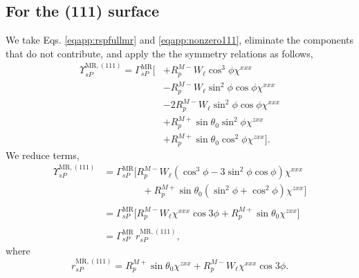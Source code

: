 \subsection{For the (111) surface}

We take Eqs. \eqref{eqapp:rspfullmr} and \eqref{eqapp:nonzero111}, eliminate the
components that do not contribute, and apply the the symmetry relations as
follows,
\begin{equation*}
\begin{split}
\Upsilon^{\mathrm{MR},(111)}_{sP} =
\Gamma^{\mathrm{MR}}_{sP}
\big[
&+ R^{M-}_{p}W_{\ell}\cos^{3}\phi\chi^{xxx}\\
&- R^{M-}_{p}W_{\ell}\sin^{2}\phi\cos\phi\chi^{xxx}\\
&- 2R^{M-}_{p}W_{\ell}\sin^{2}\phi\cos\phi\chi^{xxx}\\
&+ R^{M+}_{p}\sin\theta_{0}\sin^{2}\phi\chi^{zxx}\\
&+ R^{M+}_{p}\sin\theta_{0}\cos^{2}\phi\chi^{zxx}
\big].
\end{split}
\end{equation*}
We reduce terms,
\begin{equation*}
\begin{split}
\Upsilon^{\mathrm{MR},(111)}_{sP} &=
\Gamma^{\mathrm{MR}}_{sP}
\big[
R^{M-}_{p}W_{\ell}(\cos^{3}\phi - 3\sin^{2}\phi\cos\phi)\chi^{xxx}\\
&\qquad\qquad+ R^{M+}_{p}\sin\theta_{0}(\sin^{2}\phi + \cos^{2}\phi)\chi^{zxx}
\big]\\\\
&=
\Gamma^{\mathrm{MR}}_{sP}
\big[
R^{M-}_{p}W_{\ell}\chi^{xxx}\cos3\phi + R^{M+}_{p}\sin\theta_{0}\chi^{zxx}
\big]\\\\
& = \Gamma^{\mathrm{MR}}_{sP}\,r^{\mathrm{MR},(111)}_{sP},
\end{split}
\end{equation*}
where
\begin{equation}\label{eqapp:final-rsp.mr.111}
r^{\mathrm{MR},(111)}_{sP} = 
R^{M+}_{p}\sin\theta_{0}\chi^{zxx} + R^{M-}_{p}W_{\ell}\chi^{xxx}\cos3\phi.
\end{equation}

